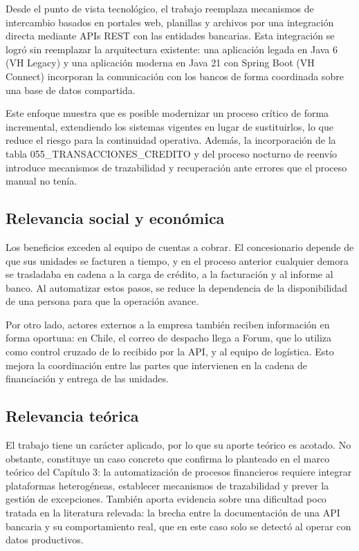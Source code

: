 Desde el punto de vista tecnológico, el trabajo reemplaza mecanismos de intercambio basados en portales web, planillas y archivos por una integración directa mediante APIs REST con las entidades bancarias. Esta integración se logró sin reemplazar la arquitectura existente: una aplicación legada en Java 6 (VH Legacy) y una aplicación moderna en Java 21 con Spring Boot (VH Connect) incorporan la comunicación con los bancos de forma coordinada sobre una base de datos compartida.

Este enfoque muestra que es posible modernizar un proceso crítico de forma incremental, extendiendo los sistemas vigentes en lugar de sustituirlos, lo que reduce el riesgo para la continuidad operativa. Además, la incorporación de la tabla 055\_TRANSACCIONES\_CREDITO y del proceso nocturno de reenvío introduce mecanismos de trazabilidad y recuperación ante errores que el proceso manual no tenía.

\subsection{Relevancia social y económica}

Los beneficios exceden al equipo de cuentas a cobrar. El concesionario depende de que sus unidades se facturen a tiempo, y en el proceso anterior cualquier demora se trasladaba en cadena a la carga de crédito, a la facturación y al informe al banco. Al automatizar estos pasos, se reduce la dependencia de la disponibilidad de una persona para que la operación avance.

Por otro lado, actores externos a la empresa también reciben información en forma oportuna: en Chile, el correo de despacho llega a Forum, que lo utiliza como control cruzado de lo recibido por la API, y al equipo de logística. Esto mejora la coordinación entre las partes que intervienen en la cadena de financiación y entrega de las unidades.

\subsection{Relevancia teórica}

El trabajo tiene un carácter aplicado, por lo que su aporte teórico es acotado. No obstante, constituye un caso concreto que confirma lo planteado en el marco teórico del Capítulo 3: la automatización de procesos financieros requiere integrar plataformas heterogéneas, establecer mecanismos de trazabilidad y prever la gestión de excepciones. También aporta evidencia sobre una dificultad poco tratada en la literatura relevada: la brecha entre la documentación de una API bancaria y su comportamiento real, que en este caso solo se detectó al operar con datos productivos.

